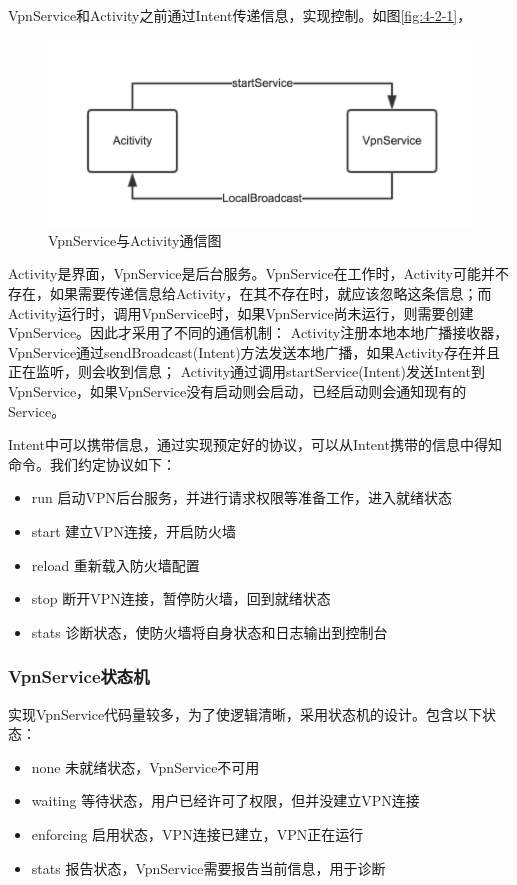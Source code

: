 \documentclass[format=final, language=chinese, degree=fyp]{hustthesis}
\begin{document}
VpnService和Activity之前通过Intent传递信息，实现控制。如图\autoref{fig:4-2-1}，

\begin{figure}[h]
	\centering
	\includegraphics[width=.8\textwidth]{image_intent_commuciate.png}
	\caption{VpnService与Activity通信图}\label{fig:4-2-1}
\end{figure}

Activity是界面，VpnService是后台服务。VpnService在工作时，Activity可能并不存在，如果需要传递信息给Activity，在其不存在时，就应该忽略这条信息；而Activity运行时，调用VpnService时，如果VpnService尚未运行，则需要创建VpnService。因此才采用了不同的通信机制：
Activity注册本地本地广播接收器，VpnService通过sendBroadcast(Intent)方法发送本地广播，如果Activity存在并且正在监听，则会收到信息；
Activity通过调用startService(Intent)发送Intent到VpnService，如果VpnService没有启动则会启动，已经启动则会通知现有的Service。

Intent中可以携带信息，通过实现预定好的协议，可以从Intent携带的信息中得知命令。我们约定协议如下：
\begin{itemize}
    \item run     启动VPN后台服务，并进行请求权限等准备工作，进入就绪状态
    \item start   建立VPN连接，开启防火墙
    \item reload  重新载入防火墙配置
    \item stop    断开VPN连接，暂停防火墙，回到就绪状态
    \item stats   诊断状态，使防火墙将自身状态和日志输出到控制台
\end{itemize}

\subsubsection{VpnService状态机}

实现VpnService代码量较多，为了使逻辑清晰，采用状态机的设计。包含以下状态：
\begin{itemize}
    \item none          未就绪状态，VpnService不可用
    \item waiting       等待状态，用户已经许可了权限，但并没建立VPN连接
    \item enforcing     启用状态，VPN连接已建立，VPN正在运行
    \item stats         报告状态，VpnService需要报告当前信息，用于诊断
\end{itemize}
\end{document}

